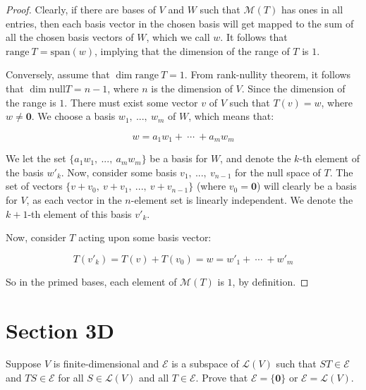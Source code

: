 \documentclass[10pt, oneside]{article}
\newenvironment{problem}[2][Problem]{\begin{trivlist}
\item[\hskip \labelsep {\bfseries #1}\hskip \labelsep {\bfseries #2.}]}{\end{trivlist}}
\newcommand{\Null}{\text{null}}
\begin{document}
    \begin{proof}

      Clearly, if there are bases of $V$ and $W$ such that $\mathcal{M}(T)$ has ones in all entries, then each basis vector in the chosen basis
      will get mapped to the sum of all the chosen basis vectors of $W$, which we call $w$. It follows that $\text{range} \ T = \text{span}(w)$, implying
      that the dimension of the range of $T$ is $1$.
      \newline

      Conversely, assume that $\dim \text{range} \ T = 1$. From rank-nullity theorem, it follows that $\dim \Null T = n - 1$, where
      $n$ is the dimension of $V$. Since the dimension of the range is $1$. There must exist some vector $v$ of $V$ such that
      $T(v) = w$, where $w \neq \boldsymbol 0$. We choose a basis $w_1, \ ..., \ w_m$ of $W$, which means that:

      $$w = a_1 w_1 + \ \cdots \ + a_m w_m$$

      We let the set $\{a_1 w_1, \ ..., \ a_m w_m\}$ be a basis for $W$, and denote the $k$-th element of the basis $w'_k$.
      Now, consider some basis $v_1, \ ..., \ v_{n - 1}$ for the null space of $T$.
      The set of vectors $\{v + v_0, \ v + v_1, \ ..., \ v + v_{n - 1}\}$ (where $v_0 = \boldsymbol 0$) will clearly be a basis for $V$, as each vector in the $n$-element set is linearly independent. We
      denote the $k + 1$-th element of this basis $v'_k$.
      \newline

      Now, consider $T$ acting upon some basis vector:

      $$T(v'_k) = T(v) + T(v_0) = w = w'_1 + \ \cdots \ + w'_m$$

      So in the primed bases, each element of $\mathcal{M}(T)$ is $1$, by definition.

    \end{proof}

    \section{Section 3D}

    \begin{problem}{3.17}
      Suppose $V$ is finite-dimensional and $\mathcal{E}$ is a subspace of $\mathcal{L}(V)$ such that $ST \in \mathcal{E}$ and $TS \in \mathcal{E}$ for
      all $S \in \mathcal{L}(V)$ and all $T \in \mathcal{E}$. Prove that $\mathcal{E} = \{\boldsymbol 0\}$ or $\mathcal{E} = \mathcal{L}(V)$.

    \end{problem}
\end{document}
